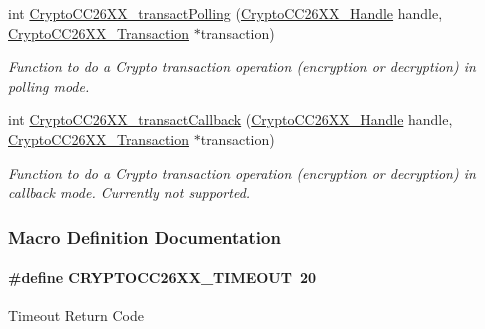 \begin{DoxyCompactItemize}
int \hyperlink{_crypto_c_c26_x_x_8h_a2efbef5e059c752e1f5797a4ef3713a3}{Crypto\+C\+C26\+X\+X\+\_\+transact\+Polling} (\hyperlink{_crypto_c_c26_x_x_8h_a8737c63107a1cb5548ba06f7a48259b5}{Crypto\+C\+C26\+X\+X\+\_\+\+Handle} handle, \hyperlink{struct_crypto_c_c26_x_x___transaction}{Crypto\+C\+C26\+X\+X\+\_\+\+Transaction} $\ast$transaction)
\begin{DoxyCompactList}\small\item\em Function to do a Crypto transaction operation (encryption or decryption) in polling mode. \end{DoxyCompactList}\item 
int \hyperlink{_crypto_c_c26_x_x_8h_a99eb096ad8f78acf23d4e4b75616dc95}{Crypto\+C\+C26\+X\+X\+\_\+transact\+Callback} (\hyperlink{_crypto_c_c26_x_x_8h_a8737c63107a1cb5548ba06f7a48259b5}{Crypto\+C\+C26\+X\+X\+\_\+\+Handle} handle, \hyperlink{struct_crypto_c_c26_x_x___transaction}{Crypto\+C\+C26\+X\+X\+\_\+\+Transaction} $\ast$transaction)
\begin{DoxyCompactList}\small\item\em Function to do a Crypto transaction operation (encryption or decryption) in callback mode. Currently not supported. \end{DoxyCompactList}\end{DoxyCompactItemize}


\subsubsection{Macro Definition Documentation}
\paragraph[{C\+R\+Y\+P\+T\+O\+C\+C26\+X\+X\+\_\+\+T\+I\+M\+E\+O\+U\+T}]{\setlength{\rightskip}{0pt plus 5cm}\#define C\+R\+Y\+P\+T\+O\+C\+C26\+X\+X\+\_\+\+T\+I\+M\+E\+O\+U\+T~20}\label{_crypto_c_c26_x_x_8h_a8a94999f3768d815e26ac50a0debeeb0}
Timeout Return Code 
